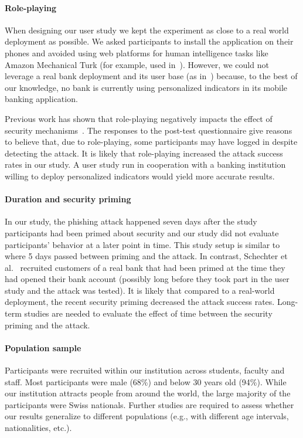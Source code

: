 \paragraph{Role-playing}
When designing our user study we kept the experiment as close to a real world deployment as possible.
We asked participants to install the application on their phones and avoided using web platforms for human intelligence tasks like Amazon Mechanical Turk (for example, used in~\cite{lee-w2sp14}).
However, we could not leverage a real bank deployment and its user base (as in~\cite{schechter07sp}) because, to the best of our knowledge, no bank is currently using personalized indicators in its mobile banking application.

Previous work has shown that role-playing negatively impacts the effect of security mechanisms~\cite{schechter07sp}.
The responses to the post-test questionnaire give reasons to believe that, 
due to role-playing, some participants may have logged in despite detecting the attack. It is likely that role-playing increased the attack success rates in our study.
A user study run in cooperation with a banking institution willing to deploy personalized indicators would yield more accurate results.

\paragraph{Duration and security priming}
In our study, the phishing attack happened seven days after the study participants had been primed about security and our study did
not evaluate participants' behavior at a later point in time.
This study setup is similar to~\cite{lee-w2sp14} where 5 days passed between priming and the attack.
In contrast, Schechter et al.~\cite{schechter07sp} recruited customers of a real bank that had been primed at the time they had opened their bank account (possibly long before they took part in the user study and the attack was tested).
It is likely that compared to a real-world deployment, the recent security priming decreased the attack success rates.
Long-term studies are needed to evaluate the effect of time between the security priming and the attack.


\paragraph{Population sample}
Participants were recruited within our institution across students, faculty and staff. 
Most participants were male (68\%) and below 30 years old (94\%). 
While our institution attracts people from around the world, the large majority of the participants were Swiss nationals. 
Further studies are required to assess whether our results generalize to different populations (e.g., with different age intervals, nationalities, etc.). 

